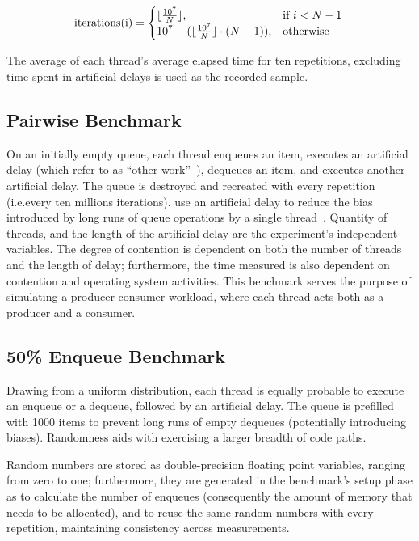 \[
    \text{iterations(i)} = 
    \begin{cases}
        \lfloor\frac{10^7}{N}\rfloor, & \text{if}~i < N-1 \\
        10^7 - (\lfloor \frac{10^7}{N} \rfloor \cdot (N-1)), & \text{otherwise}
    \end{cases} \\
\]

The average of each thread's average elapsed time for ten repetitions,
excluding time spent in artificial delays is used as the recorded sample.

\subsection{Pairwise Benchmark}

On an initially empty queue, each thread enqueues an item, executes an
artificial delay (which \citeauthor{michael1996simple} refer to as ``other
work''~\citep{michael1996simple}), dequeues an item, and executes another
artificial delay. The queue is destroyed and recreated with every repetition
(i.e.every ten millions iterations). \citeauthor{michael1996simple} use an
artificial delay to reduce the bias introduced by long runs of queue operations
by a single thread~\citep{michael1996simple}. Quantity of threads, and the length
of the artificial delay are the experiment's independent variables.
The degree of contention is dependent on both the number of threads and the length
of delay; furthermore, the time measured is also dependent on
contention and operating system activities. This benchmark serves the purpose
of simulating a producer-consumer workload, where each thread acts both as a
producer and a consumer.

\subsection{50\% Enqueue Benchmark}
Drawing from a uniform distribution, each thread is equally probable to execute
an enqueue or a dequeue, followed by an artificial delay. The queue is prefilled
with 1000 items to prevent long runs of empty dequeues (potentially introducing
biases). Randomness aids with exercising a larger breadth of code paths.

Random numbers are stored as double-precision floating point variables, ranging
from zero to one; furthermore, they are generated in the benchmark's setup
phase as to calculate the number of enqueues (consequently the
amount of memory that needs to be allocated), and to reuse the same random
numbers with every repetition, maintaining consistency across measurements. 


